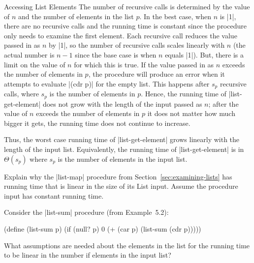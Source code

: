 \begin{schemeregion}
\begin{examplenobar}{Accessing List Elements}
The number of recursive calls is determined by the value of $n$ and the number of elements in the list $p$.  In the best case, when $n$ is \scheme|1|, there are no recursive calls and the running time is constant since the procedure only needs to examine the first element.  Each recursive call reduces the value passed in as $n$ by \scheme|1|, so the number of recursive calls scales linearly with $n$ (the actual number is $n - 1$ since the base case is when $n$ equals \scheme|1|).  But, there is a limit on the value of $n$ for which this is true.  If the value passed in as $n$ exceeds the number of elements in $p$, the procedure will produce an error when it attempts to evaluate \scheme|(cdr p)| for the empty list.  This happens after $s_p$ recursive calls, where $s_p$ is the number of elements in $p$.  Hence, the running time of \scheme|list-get-element| does not grow with the length of the input passed as $n$; after the value of $n$ exceeds the number of elements in $p$ it does not matter how much bigger it gets, the running time does not continue to increase.  

Thus, the worst case running time of \scheme|list-get-element| grows linearly with the length of the input list.  Equivalently, the running time of \scheme|list-get-element| is in $\Theta(s_p)$ where $s_p$ is the number of elements in the input list.
\end{examplenobar}

\beforeex
\begin{exercise}
Explain why the \scheme|list-map| procedure from Section~\ref{sec:examining-lists} has running time that is linear in the size of its List input.  Assume the procedure input has constant running time.
\solution{\LATER{}}
\end{exercise}
\afterex

\beforeex
\begin{exercise}
Consider the \scheme|list-sum| procedure (from Example~5.2)\LATER{\ref{example:list-sum})}:
\begin{schemedisplay}
(define (list-sum p) (if (null? p) 0 (+ (car p) (list-sum (cdr p)))))
\end{schemedisplay}
What assumptions are needed about the elements in the list for the running time to be linear in the number if elements in the input list?
\solution{\LATER{}}
\end{exercise}
\afterex


\end{schemeregion}
